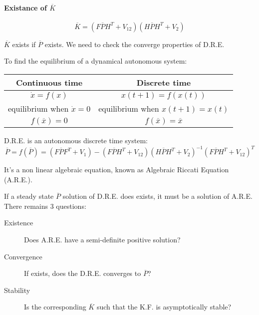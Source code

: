 \paragraph{Existance of $\overline{K}$}

\[
    \overline{K} = \left(F\overline{P}H^T + V_{12}\right)\left(H\overline{P}H^T+V_2\right)
\]

$\overline{K}$ exists if $\overline{P}$ exists.
We need to check the converge properties of D.R.E.

To find the equilibrium of a dynamical autonomous system:

\begin{center}
    \begin{tabular}{c|c}
        \textbf{Continuous time} & \textbf{Discrete time} \\
        \hline
        $\dot{x} = f(x)$ & $x(t+1) = f(x(t))$ \\
        equilibrium when $\dot{x} = 0$ & equilibrium when $x(t+1) = x(t)$ \\
        $f(\overline{x}) = 0$ & $f(\overline{x}) = \overline{x}$ \\
    \end{tabular}
\end{center}

D.R.E. is an autonomous discrete time system:
\[
    \overline{P} = f(\overline{P}) = \left( F\overline{P}F^T + V_1 \right)-\left(F\overline{P}H^T + V_{12}\right)\left(H\overline{P}H^T + V_2\right)^{-1}\left(F\overline{P}H^T+V_{12}\right)^T
\]

It's a non linear algebraic equation, known as Algebraic Riccati Equation (A.R.E.).

If a steady state $\overline{P}$ solution of D.R.E. does exists, it must be a solution of A.R.E.
There remains 3 questions:
\begin{description}
    \item[Existence] Does A.R.E. have a semi-definite positive solution?
    \item[Convergence] If exists, does the D.R.E. converges to $\overline{P}$?
    \item[Stability] Is the corresponding $\overline{K}$ such that the K.F. is asymptotically stable?
\end{description}
